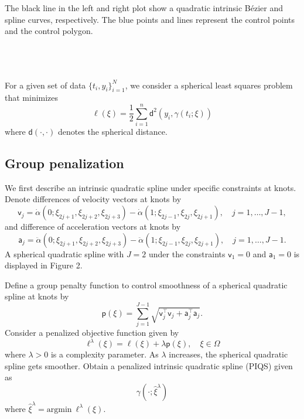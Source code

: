 \documentclass[a0,portrait]{a0poster}
\begin{document}
\begin{multicols}{2}
\noindent
\begin{minipage}{\columnwidth}
\makeatletter
\newcommand{\@captype}{figure}
\makeatother
\centering
\subfloat[A quadratic B\'ezier curve ($J = 1$)]{%

   \label{fig:evaluation:revenue}%
} \qquad%
\subfloat[A quadratic spline ($J = 2$)]{%

   \label{fig:evaluation:avgPrice}%
}
\caption{The black line in the left and right  plot show a quadratic intrinsic B\'ezier and spline curves,
respectively. The blue points and lines represent the control points and the control polygon.}
\end{minipage}
\\ \\ \\
\noindent
For a given set of data $\{t_i, y_i\}_{i=1}^N$, we consider a spherical least squares problem that minimizes
$$
\ell(\xi) = \frac{1}{2} \sum_{i=1}^n
\mathsf{d}^2(y_i, \gamma(t_i; \xi))
$$
where $\mathsf{d}(\cdot, \cdot)$ denotes  the spherical distance.

\subsection*{Group penalization}
We first describe an intrinsic quadratic spline under specific constraints at knots.
Denote
differences of velocity vectors at knots by
$$
\mathsf{v}_j =
\dot{\alpha}
(0;\xi_{2j+1}, \xi_{2j+2}, \xi_{2j+3}) -
\dot{\alpha}
(1;\xi_{2j-1}, \xi_{2j}, \xi_{2j+1}),
\quad j = 1, \ldots, J-1,
$$
and difference of acceleration vectors at knots by
$$
\mathsf{a}_j =
\ddot{\alpha}
(0; \xi_{2j+1}, \xi_{2j+2}, \xi_{2j+3}) - \ddot{\alpha}
(1; \xi_{2j-1}, \xi_{2j}, \xi_{2j+1}),
\quad j = 1, \ldots, J - 1.
$$
A spherical quadratic spline with $J = 2$ under the constraints $\mathsf{v}_1 = 0$ and
$\mathsf{a}_1 = 0$ is displayed in Figure 2.


\begin{center}

\end{center}
\vspace{0.5cm}

Define a group penalty function to control smoothness of a spherical quadratic spline
at knots by
$$
\mathsf{p}(\xi) = \sum_{j=1}^{J-1} \sqrt{\mathsf{v}_j^{\top} \mathsf{v}_j + \mathsf{a}_j^{\top} \mathsf{a}_j}.
$$
Consider a penalized objective function given by
$$
\ell^{\lambda}(\xi) = \ell(\xi) + \lambda \mathsf{p}(\xi), \quad \xi \in \Omega
$$
where $\lambda > 0$ is a complexity parameter.
As $\lambda$ increases, the spherical quadratic spline gets smoother.
Obtain a penalized intrinsic quadratic spline (PIQS) given as
$$
\gamma(\cdot; \hat{\xi}^{\lambda})
$$
where $\hat{\xi}^{\lambda} = \text{argmin}\ \ell^{\lambda}(\xi)$.


\end{multicols}
\end{document}
